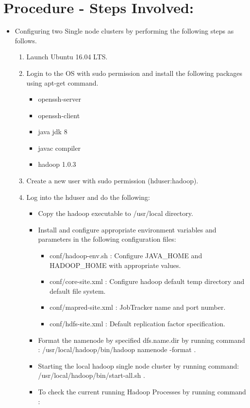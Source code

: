 \documentclass[a4paper,10pt]{article}
\begin{document}
\section{Procedure - Steps Involved:}
\begin{itemize}
\item Configuring two Single node clusters by performing the following steps as follows.	
\begin{enumerate}
	\item Launch Ubuntu 16.04 LTS.
	\item Login to the OS with sudo permission and install the following packages using apt-get command.
	\begin{itemize}
		\item openssh-server
		\item openssh-client
		\item java jdk 8
		\item javac compiler
		\item hadoop 1.0.3
	\end{itemize}
	\item Create a new user with sudo permission (hduser:hadoop).
	\item Log into the hduser and do the following:
	\begin{itemize}
		\item Copy the hadoop executable to /usr/local directory.
		\item Install and configure appropriate environment variables and parameters in the following configuration files: 
		\begin{itemize}
			\item conf/hadoop-env.sh : Configure JAVA\_HOME and HADOOP\_HOME with appropriate values.
			\item conf/core-site.xml : Configure hadoop default temp directory and default file system.
			\item conf/mapred-site.xml : JobTracker name and port number.
			\item conf/hdfs-site.xml : Default replication factor specification.
		\end{itemize}
		\item Format the namenode by specified dfs.name.dir by running command : /usr/local/hadoop/bin/hadoop namenode -format .
		\item Starting the local hadoop single node cluster by running command: 
		/usr/local/hadoop/bin/start-all.sh .
		\item To check the current running Hadoop Processes by running command : 

\end{itemize}
\end{enumerate}
\end{itemize}
\end{document}
